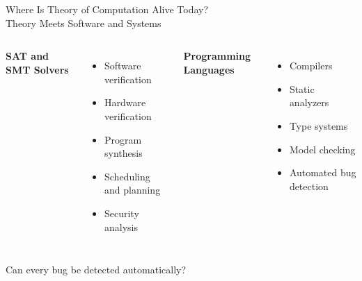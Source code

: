\documentclass[10pt,aspectratio=169]{beamer}
\begin{document}
\begin{frame}{Where Is Theory of Computation Alive Today?\\
Theory Meets Software and Systems}

\begin{columns}[T]

\textbf{SAT and SMT Solvers}

\begin{itemize}
\item Software verification
\item Hardware verification
\item Program synthesis
\item Scheduling and planning
\item Security analysis
\end{itemize}

\textbf{Programming Languages}

\begin{itemize}
\item Compilers
\item Static analyzers
\item Type systems
\item Model checking
\item Automated bug detection
\end{itemize}

\end{columns}

\vfill

\begin{center}
\alert{Can every bug be detected automatically?}
\end{center}

\end{frame}
\end{document}
